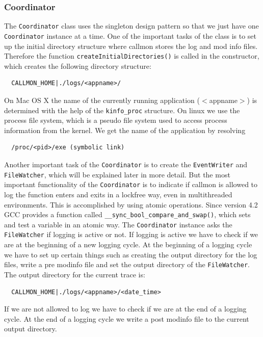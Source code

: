 \subsubsection{Coordinator}

The \verb=Coordinator= class uses the singleton design pattern so that we just have one \verb=Coordinator= instance at a time. One of the important tasks of the class is to set up the initial directory structure where callmon stores the log and mod info files. Therefore the function \verb=createInitialDirectories()= is called in the constructor, which creates the following directory structure:

\begin{verbatim}
  CALLMON_HOME|./logs/<appname>/
\end{verbatim}

On Mac OS X the name of the currently running application ($<$appname$>$) is determined with the help of the \verb=kinfo_proc= structure. On linux we use the process file system, which is a pseudo file system used to access process information from the kernel. We get the name of the application by resolving 

\begin{verbatim}
  /proc/<pid>/exe (symbolic link)	
\end{verbatim}

Another important task of the \verb=Coordinator= is to create the \verb=EventWriter= and \verb=FileWatcher=, which will be explained later in more detail. But the most important functionality of the \verb=Coordinator= is to indicate if callmon is allowed to log the function enters and exits in a lockfree way, even in multithreaded environments. This is accomplished by using atomic operations. Since version 4.2 GCC provides a function called \verb=__sync_bool_compare_and_swap()=, which sets and test a variable in an atomic way. The \verb=Coordinator= instance asks the \verb=FileWatcher= if logging is active or not. If logging is active we have to check if we are at the beginning of a new logging cycle. At the beginning of a logging cycle we have to set up certain things such as creating the output directory for the log files, write a pre modinfo file and set the output directory of the \verb=FileWatcher=. The output directory for the current trace is:

\begin{verbatim}
  CALLMON_HOME|./logs/<appname>/<date_time>
\end{verbatim}

If we are not allowed to log we have to check if we are at the end of a logging cycle. At the end of a logging cycle we write a post modinfo file to the current output directory.

